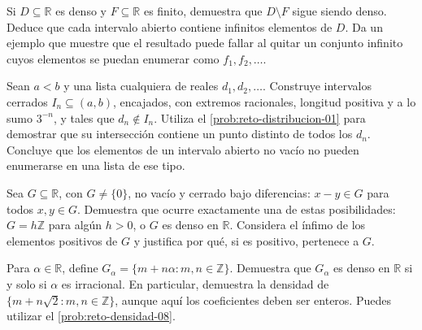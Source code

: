 \begin{samepage}
\begin{problem}\label{prob:reto-densidad-06}
Si $D\subseteq\mathbb R$ es denso y $F\subseteq\mathbb R$ es finito, demuestra que $D\setminus F$ sigue siendo denso. Deduce que cada intervalo abierto contiene infinitos elementos de $D$. Da un ejemplo que muestre que el resultado puede fallar al quitar un conjunto infinito cuyos elementos se puedan enumerar como $f_1,f_2,\ldots$.
\end{problem}
\end{samepage}
\par{}

\begin{samepage}
\begin{problem}\label{prob:reto-densidad-07}
Sean $a<b$ y una lista cualquiera de reales $d_1,d_2,\ldots$. Construye intervalos cerrados $I_n\subseteq(a,b)$, encajados, con extremos racionales, longitud positiva y a lo sumo $3^{-n}$, y tales que $d_n\notin I_n$. Utiliza el \cref{prob:reto-distribucion-01} para demostrar que su intersección contiene un punto distinto de todos los $d_n$. Concluye que los elementos de un intervalo abierto no vacío no pueden enumerarse en una lista de ese tipo.
\end{problem}
\end{samepage}
\par{}

\begin{samepage}
\begin{problem}\label{prob:reto-densidad-08}
Sea $G\subseteq\mathbb R$, con $G\ne\{0\}$, no vacío y cerrado bajo diferencias: $x-y\in G$ para todos $x,y\in G$. Demuestra que ocurre exactamente una de estas posibilidades: $G=h\mathbb Z$ para algún $h>0$, o $G$ es denso en $\mathbb R$. Considera el ínfimo de los elementos positivos de $G$ y justifica por qué, si es positivo, pertenece a $G$.~\cite{mseSubgrupos}
\end{problem}
\end{samepage}
\par{}

\begin{samepage}
\begin{problem}\label{prob:reto-densidad-09}
Para $\alpha\in\mathbb R$, define $G_\alpha=\{m+n\alpha:m,n\in\mathbb Z\}$. Demuestra que $G_\alpha$ es denso en $\mathbb R$ si y solo si $\alpha$ es irracional. En particular, demuestra la densidad de $\{m+n\sqrt2:m,n\in\mathbb Z\}$, aunque aquí los coeficientes deben ser enteros. Puedes utilizar el \cref{prob:reto-densidad-08}.~\cite{mseGrupoRaiz}
\end{problem}
\end{samepage}
\par{}

